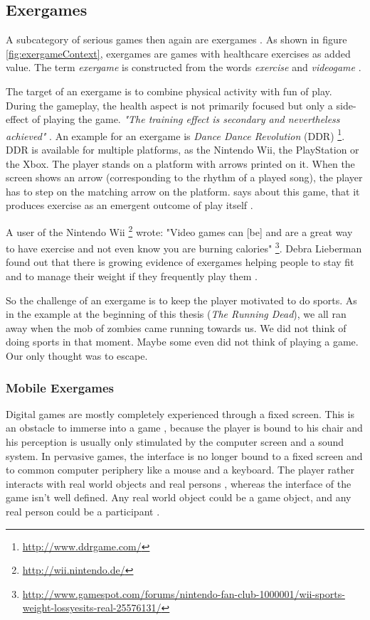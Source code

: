 \subsection{Exergames}
A subcategory of serious games then again are exergames \citep{gobel2010serious} \citep{knoll2014urban}. As shown in figure \ref{fig:exergameContext}, exergames are games with healthcare exercises as added value. The term \emph{exergame} is constructed from the words \emph{exercise} and \emph{videogame} \citep{bogost2007persuasive}.

The target of an exergame is to combine physical activity with fun of play. During the gameplay, the health aspect is not primarily focused but only a side-effect of playing the game. \emph{"The training effect is secondary and nevertheless achieved"} \citep{knoll2014urban}. An example for an exergame is \emph{Dance Dance Revolution} (DDR) \footnote{\url{http://www.ddrgame.com/}}. DDR is available for multiple platforms, as the Nintendo Wii, the PlayStation or the Xbox. The player stands on a platform with arrows printed on it. When the screen shows an arrow (corresponding to the rhythm of a played song), the player has to step on the matching arrow on the platform. \citeauthor{bogost2007persuasive} says about this game, that it produces exercise as an emergent outcome of play itself \citep{bogost2007persuasive}.

A user of the Nintendo Wii \footnote{\url{http://wii.nintendo.de/}} wrote: "Video games can [be] and are a great way to have exercise and not even know you are burning calories" \footnote{\url{http://www.gamespot.com/forums/nintendo-fan-club-1000001/wii-sports-weight-lossyesits-real-25576131/}}. Debra Lieberman found out that there is growing evidence of exergames helping people to stay fit and to manage their weight if they frequently play them \citep{Lieberman06dancegames}.

So the challenge of an exergame is to keep the player motivated to do sports. As in the example at the beginning of this thesis (\emph{The Running Dead}), we all ran away when the mob of zombies came running towards us. We did not think of doing sports in that moment. Maybe some even did not think of playing a game. Our only thought was to escape.

\subsubsection{Mobile Exergames}
Digital games are mostly completely experienced through a fixed screen. This is an obstacle to immerse into a game \citep{cheok2002touch}, because the player is bound to his chair and his perception is usually only stimulated by the computer screen and a sound system. In pervasive games, the interface is no longer bound to a fixed screen and to common computer periphery like a mouse and a keyboard. The player rather interacts with real world objects and real persons \citep{nieuwdorp2009pervasive}, whereas the interface of the game isn't well defined. Any real world object could be a game object, and any real person could be a participant \citep{montola2005exploring}.

